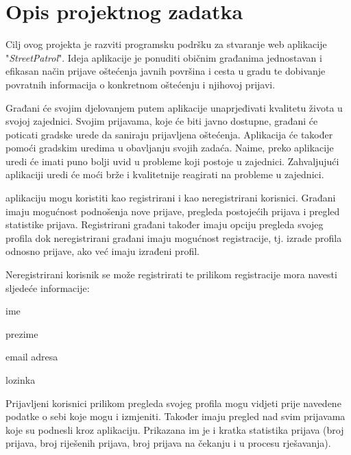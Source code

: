 \chapter{Opis projektnog zadatka}
		
		Cilj ovog projekta je razviti programsku podršku za stvaranje web aplikacije "\textit{StreetPatrol}". Ideja aplikacije je ponuditi običnim građanima jednostavan i efikasan način prijave oštećenja javnih površina i cesta u gradu te dobivanje povratnih informacija o konkretnom oštećenju i njihovoj prijavi. 
		
		Građani će svojim djelovanjem putem aplikacije unaprjeđivati kvalitetu života u svojoj zajednici. Svojim prijavama, koje će biti javno dostupne, građani će poticati gradske urede da saniraju prijavljena oštećenja. Aplikacija će također pomoći gradskim uredima u obavljanju svojih zadaća. Naime, preko aplikacije uredi će imati puno bolji uvid u probleme koji postoje u zajednici. Zahvaljujući aplikaciji uredi će moći brže i kvalitetnije reagirati na probleme u zajednici.
		
		 aplikaciju mogu koristiti kao registrirani i kao neregistrirani korisnici. Građani imaju mogućnost podnošenja nove prijave, pregleda postojećih prijava i pregled statistike prijava. Registrirani građani također imaju opciju pregleda svojeg profila dok neregistrirani građani imaju mogućnost registracije, tj. izrade profila odnosno prijave, ako već imaju izrađeni profil.
		
		Neregistrirani korisnik se može registrirati te prilikom registracije mora navesti sljedeće informacije:
		\begin{packed_item} 
			\item ime
			\item prezime
			\item email adresa
			\item lozinka
		\end{packed_item}  
		Prijavljeni korisnici prilikom pregleda svojeg profila mogu vidjeti prije navedene podatke o sebi koje mogu i izmjeniti. Također imaju pregled nad svim prijavama koje su podnesli kroz aplikaciju. Prikazana im je i kratka statistika prijava (broj prijava, broj riješenih prijava, broj prijava na čekanju i u procesu rješavanja). 
		
